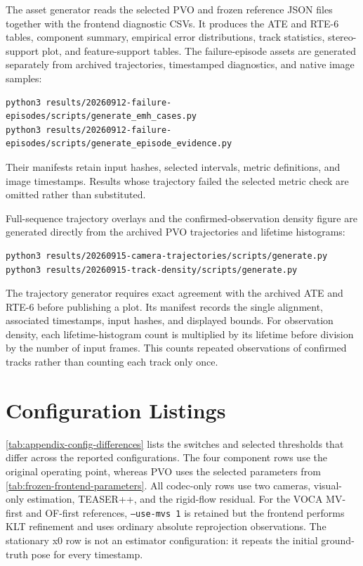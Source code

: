 The asset generator reads the selected PVO and frozen reference JSON files together with the frontend diagnostic
CSVs. It produces the ATE and RTE-6 tables, component summary, empirical error
distributions, track statistics, stereo-support plot, and feature-support tables.
The failure-episode assets are generated separately
from archived trajectories, timestamped diagnostics, and native image samples:

\begin{lstlisting}
python3 results/20260912-failure-episodes/scripts/generate_emh_cases.py
python3 results/20260912-failure-episodes/scripts/generate_episode_evidence.py
\end{lstlisting}

Their manifests retain input hashes, selected intervals, metric definitions,
and image timestamps. Results whose trajectory failed the selected
metric check are omitted rather than substituted.

Full-sequence trajectory overlays and the confirmed-observation density figure
are generated directly from the archived PVO trajectories and lifetime
histograms:

\begin{lstlisting}
python3 results/20260915-camera-trajectories/scripts/generate.py
python3 results/20260915-track-density/scripts/generate.py
\end{lstlisting}

The trajectory generator requires exact agreement with the archived ATE and
RTE-6 before publishing a plot. Its manifest records the single alignment,
associated timestamps, input hashes, and displayed bounds. For observation
density, each lifetime-histogram count is multiplied by its lifetime before
division by the number of input frames. This counts repeated observations of
confirmed tracks rather than counting each track only once.

\section{Configuration Listings}

\autoref{tab:appendix-config-differences} lists the switches and selected
thresholds that differ across the reported configurations. The four component
rows use the original operating point, whereas PVO uses the selected
parameters from \autoref{tab:frozen-frontend-parameters}. All codec-only rows
use two cameras, visual-only estimation, TEASER++, and the rigid-flow residual.
For the VOCA
MV-first and OF-first references,
\texttt{--use-mvs 1} is retained but the frontend performs KLT refinement and
uses ordinary absolute reprojection observations. The stationary x0 row is not
an estimator configuration: it repeats the initial ground-truth pose for every
timestamp.

